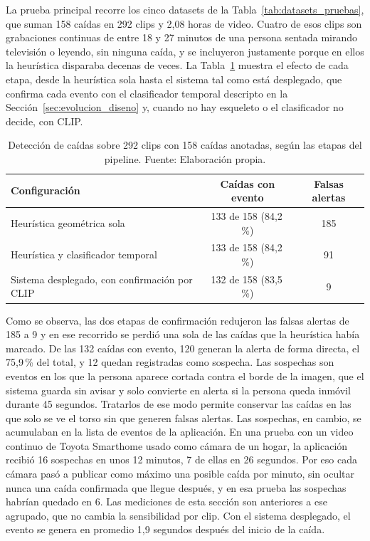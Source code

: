 La prueba principal recorre los cinco datasets de la Tabla~\ref{tab:datasets_pruebas}, que suman 158 caídas en 292 clips y 2,08 horas de video.
Cuatro de esos clips son grabaciones continuas de entre 18 y 27 minutos de una persona sentada mirando televisión o leyendo, sin ninguna caída, y se incluyeron justamente porque en ellos la heurística disparaba decenas de veces.
La Tabla~\ref{tab:caidas_pipeline} muestra el efecto de cada etapa, desde la heurística sola hasta el sistema tal como está desplegado, que confirma cada evento con el clasificador temporal descripto en la Sección~\ref{sec:evolucion_diseno} y, cuando no hay esqueleto o el clasificador no decide, con CLIP.

\begin{table}[H]
\centering
\caption[Detección de caídas según las etapas del pipeline.]{Detección de caídas sobre 292 clips con 158 caídas anotadas, según las etapas del pipeline. Fuente: Elaboración propia.}
\label{tab:caidas_pipeline}
\small
\begin{tabular}{@{}lcc@{}}
\toprule
\textbf{Configuración} & \textbf{Caídas con evento} & \textbf{Falsas alertas} \\
\midrule
Heurística geométrica sola & 133 de 158 (84,2\,\%) & 185 \\
Heurística y clasificador temporal & 133 de 158 (84,2\,\%) & 91 \\
Sistema desplegado, con confirmación por CLIP & 132 de 158 (83,5\,\%) & 9 \\
\bottomrule
\end{tabular}
\end{table}

Como se observa, las dos etapas de confirmación redujeron las falsas alertas de 185 a 9 y en ese recorrido se perdió una sola de las caídas que la heurística había marcado.
De las 132 caídas con evento, 120 generan la alerta de forma directa, el 75,9\,\% del total, y 12 quedan registradas como sospecha.
Las sospechas son eventos en los que la persona aparece cortada contra el borde de la imagen, que el sistema guarda sin avisar y solo convierte en alerta si la persona queda inmóvil durante 45 segundos.
Tratarlos de ese modo permite conservar las caídas en las que solo se ve el torso sin que generen falsas alertas.
Las sospechas, en cambio, se acumulaban en la lista de eventos de la aplicación.
En una prueba con un video continuo de Toyota Smarthome usado como cámara de un hogar, la aplicación recibió 16 sospechas en unos 12 minutos, 7 de ellas en 26 segundos.
Por eso cada cámara pasó a publicar como máximo una posible caída por minuto, sin ocultar nunca una caída confirmada que llegue después, y en esa prueba las sospechas habrían quedado en 6.
Las mediciones de esta sección son anteriores a ese agrupado, que no cambia la sensibilidad por clip.
Con el sistema desplegado, el evento se genera en promedio 1,9 segundos después del inicio de la caída.

